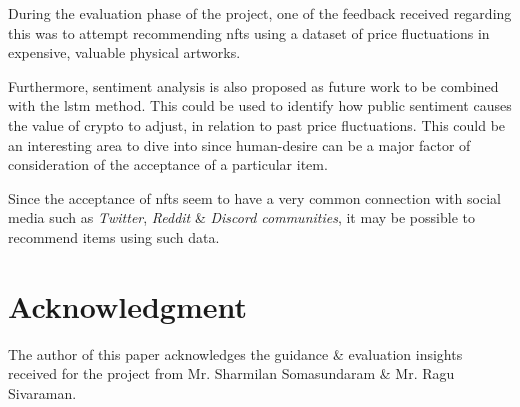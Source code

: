 \documentclass[conference]{IEEEtran}
\begin{document}
During the evaluation phase of the project, one of the feedback received regarding this was to attempt recommending \gls{nft}s using a dataset of price fluctuations in expensive, valuable physical artworks.

Furthermore, sentiment analysis is also proposed as future work to be combined with the \gls{lstm} method. This could be used to identify how public sentiment causes the value of crypto to adjust, in relation to past price fluctuations. This could be an interesting area to dive into since human-desire can be a major factor of consideration of the acceptance of a particular item.

Since the acceptance of \gls{nft}s seem to have a very common connection with social media such as \textit{Twitter}, \textit{Reddit} \& \textit{Discord communities}, it may be possible to recommend items using such data.

\section*{Acknowledgment}

The author of this paper acknowledges the guidance \& evaluation insights received for the project from Mr. Sharmilan Somasundaram \& Mr. Ragu Sivaraman.



\printbibliography %
\end{document}

